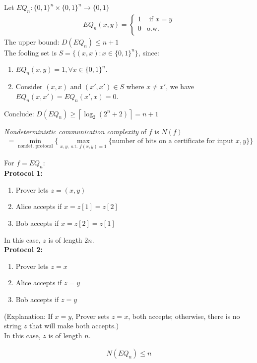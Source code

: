\begin{eg}
    Let $EQ_n : \{ 0,1 \}^{n} \times \{ 0,1 \}^{n} \to \{ 0 , 1 \} $
    \begin{align*}
        EQ_n (x,y) = \begin{cases}
            1 & \text{ if } x = y \\
            0 & \text{o.w.} \\
        \end{cases}
    \end{align*}
    The upper bound: $D(EQ_n) \le n + 1$
    \\The fooling set is $S = \{ (x,x) : x \in \{ 0,1 \}^{n} \}$, since:
    \begin{enumerate}
        \item $EQ_n(x,y) = 1, \forall x \in \{ 0,1 \}^{n}$.
        \item Consider $(x,x)$ and $(x',x') \in S$ where $x \neq x'$, we have $EQ_n(x,x') = EQ_n(x',x) = 0$.
    \end{enumerate}
    Conclude: $D(EQ_n) \ge \left\lceil \log_2(2^{n} + 2) \right\rceil = n + 1$
\end{eg}

\begin{definition}
\textit{Nondeterministic communication complexity} of $f$ is $N(f)$
    \begin{align*}
        = \min_{\text{nondet. protocal}} \{ \max_{x, y, \text{ s.t. } f(x,y) = 1} \{ \text{number of bits on a certificate for input }x,y \} \}
    \end{align*}
\end{definition}

\begin{eg}
    For $f = EQ_n$:
    \\ \textbf{Protocol 1:} 
    \begin{enumerate}
        \item Prover lets $z = (x,y)$
        \item Alice accepts if $x = z[1] = z[2]$
        \item Bob accepts if $x = z[2] = z[1]$
    \end{enumerate}
    In this case, $z$ is of length $2n$.
    \\ \textbf{Protocol 2:} 
    \begin{enumerate}
        \item Prover lets $z = x$
        \item Alice accepts if $z = y$
        \item Bob accepts if $z = y$
    \end{enumerate}
    (Explanation: If $x = y$, Prover sets $z=x$, both accepts; otherwise, there is no string $z$ that will make both accepts.)
    \\In this case, $z$ is of length $n$.
\end{eg}
\begin{remark}
    \begin{align*}
        N(EQ_n) \le n
    \end{align*}
\end{remark}

